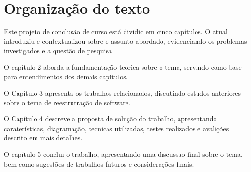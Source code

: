    \section{Organização do texto}
    
    Este projeto de conclusão de curso está dividio em cinco capítulos. O atual introduziu e contextualizou sobre o assunto abordado, evidenciando os problemas investigados e a questão de pesquisa

    O capítulo 2 aborda a  fundamentação teorica sobre o tema, servindo como  base para entendimentos dos demais capítulos.

    O Capítulo 3 apresenta os trabalhos relacionados, discutindo estudos anteriores sobre o tema de reestrutração de software.

    O Capítulo 4 descreve a proposta de solução do trabalho, apresentando caraterísticas, diagramação, tecnicas utilizadas, testes realizados e avalições descrito em mais detalhes.

    O capítulo 5 conclui o trabalho, apresentando uma discussão final sobre o tema, bem como sugestões de trabalhos futuros e considerações finais.
